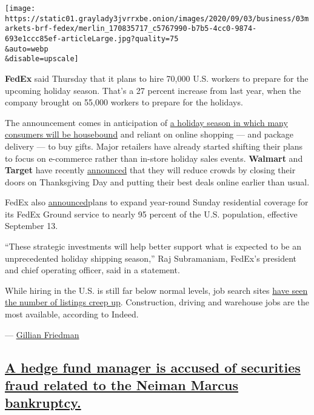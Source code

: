 \texttt{[image: https://static01.graylady3jvrrxbe.onion/images/2020/09/03/business/03markets-brf-fedex/merlin\_170835717\_c5767990-b7b5-4cc0-9874-693e1ccc85ef-articleLarge.jpg?quality=75\\\&auto=webp\\\&disable=upscale]}

\textbf{FedEx} said Thursday that it plans to hire 70,000 U.S. workers
to prepare for the upcoming holiday season. That's a 27 percent increase
from last year, when the company brought on 55,000 workers to prepare
for the holidays.

The announcement comes in anticipation of
\href{https://www.nytimes3xbfgragh.onion/2020/09/02/business/retailers-holiday-shopping.html}{a
holiday season in which many consumers will be housebound} and reliant
on online shopping --- and package delivery --- to buy gifts. Major
retailers have already started shifting their plans to focus on
e-commerce rather than in-store holiday sales events. \textbf{Walmart}
and \textbf{Target} have recently
\href{https://www.nytimes3xbfgragh.onion/live/2020/07/27/business/stock-market-today-coronavirus\#target-thanksgiving}{announced}
that they will reduce crowds by closing their doors on Thanksgiving Day
and putting their best deals online earlier than usual.

FedEx also
\href{https://newsroom.fedex.com/newsroom/fedex-enhancements-position-company-ahead-of-a-record-setting-peak-season/}{announced}plans
to expand year-round Sunday residential coverage for its FedEx Ground
service to nearly 95 percent of the U.S. population, effective September
13.

``These strategic investments will help better support what is expected
to be an unprecedented holiday shipping season,'' Raj Subramaniam,
FedEx's president and chief operating officer, said in a statement.

While hiring in the U.S. is still far below normal levels, job search
sites
\href{https://www.nytimes3xbfgragh.onion/2020/09/03/business/economy/unemployment-claims.html}{have
seen the number of listings creep up}. Construction, driving and
warehouse jobs are the most available, according to Indeed.

--- \href{http://nytimes3xbfgragh.onion/by/gillian-friedman}{Gillian
Friedman}

\hypertarget{a-hedge-fund-manager-is-accused-of-securities-fraud-related-to-the-neiman-marcus-bankruptcy}{%
\subsection{\texorpdfstring{\protect\hyperlink{a-hedge-fund-manager-is-accused-of-securities-fraud-related-to-the-neiman-marcus-bankruptcy}{A
hedge fund manager is accused of securities fraud related to the Neiman
Marcus
bankruptcy.}}{A hedge fund manager is accused of securities fraud related to the Neiman Marcus bankruptcy.}}\label{a-hedge-fund-manager-is-accused-of-securities-fraud-related-to-the-neiman-marcus-bankruptcy}}

